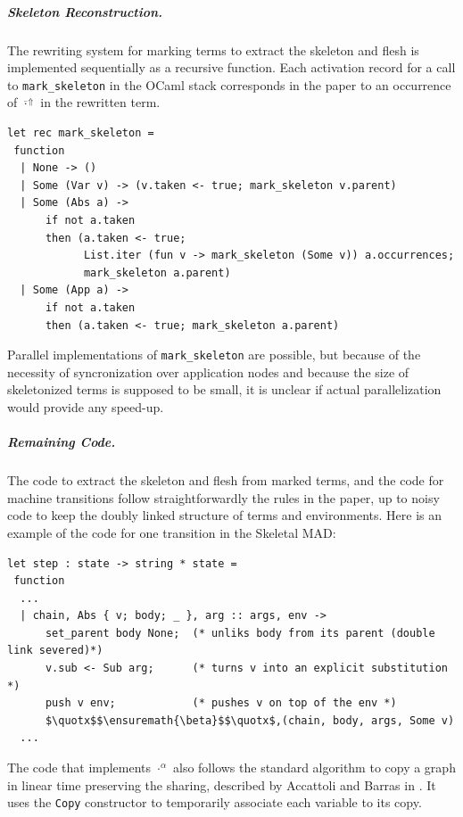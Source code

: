 \documentclass[10pt,a4paper]{article}
\theoremstyle{remark}
\newcommand{\renamenop}[1]{#1^\alpha}
\newcommand{\frontiersym}{\Uparrow}
\newcommand{\skelu}[1]{\overline{#1}^{\frontiersym}}
\begin{document}
\subparagraph{Skeleton Reconstruction.}
The rewriting system for marking terms to extract the skeleton and flesh is implemented sequentially as a recursive function.
Each activation record for a call to \lstinline{mark_skeleton} in the OCaml stack corresponds
in the paper to an occurrence of $\skelu\cdot$ in the rewritten term.
\begin{lstlisting}
let rec mark_skeleton =
 function
  | None -> ()
  | Some (Var v) -> (v.taken <- true; mark_skeleton v.parent)
  | Some (Abs a) ->
      if not a.taken
      then (a.taken <- true;
            List.iter (fun v -> mark_skeleton (Some v)) a.occurrences;
            mark_skeleton a.parent)
  | Some (App a) ->
      if not a.taken
      then (a.taken <- true; mark_skeleton a.parent)
\end{lstlisting}
Parallel implementations of \lstinline{mark_skeleton} are possible, but because of the necessity of syncronization over application nodes and because the size of skeletonized terms is supposed to be small, it is unclear if actual parallelization would provide any speed-up.

\subparagraph{Remaining Code.}
The code to extract the skeleton and flesh from marked terms, and the code for machine transitions follow
straightforwardly the rules in the paper, up to noisy code to keep the doubly linked structure of terms and environments. Here is an example of the code for one transition in the Skeletal MAD:
\newcommand{\quotx}{"}
\begin{lstlisting}
let step : state -> string * state =
 function
  ...
  | chain, Abs { v; body; _ }, arg :: args, env ->
      set_parent body None;  (* unliks body from its parent (double link severed)*)
      v.sub <- Sub arg;      (* turns v into an explicit substitution *)
      push v env;            (* pushes v on top of the env *)
      $\quotx$$\ensuremath{\beta}$$\quotx$,(chain, body, args, Some v)
  ...
\end{lstlisting}

The code that implements $\renamenop\cdot$ also follows the standard algorithm to copy a graph in linear
time preserving the sharing, described by Accattoli and Barras in \cite{DBLP:conf/ppdp/AccattoliB17}. It uses the \lstinline{Copy} constructor to temporarily associate
each variable to its copy.
\end{document}
